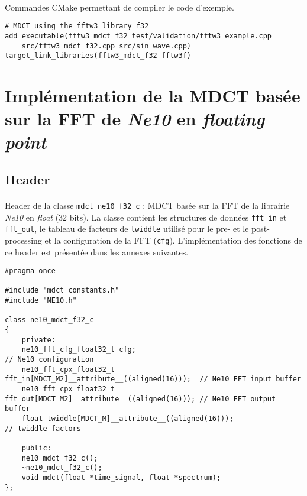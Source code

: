 \documentclass{article}
\begin{document}
\paragraph{}
Commandes CMake permettant de compiler le code d'exemple.
\lstset{language=make}
\begin{lstlisting}
# MDCT using the fftw3 library f32
add_executable(fftw3_mdct_f32 test/validation/fftw3_example.cpp
    src/fftw3_mdct_f32.cpp src/sin_wave.cpp)
target_link_libraries(fftw3_mdct_f32 fftw3f)
\end{lstlisting}




\newpage
\section{Implémentation de la MDCT basée sur la FFT de \emph{Ne10} en \emph{floating point}}\label{app:mdct_ne10_f32}
\subsection{Header}\label{app:mdct_ne10_f32_header}
\paragraph{}
Header de la classe \texttt{mdct\_ne10\_f32\_c} : MDCT basée sur la FFT de la librairie \emph{Ne10} en \emph{float} (32 bits). La classe contient les structures de données \texttt{fft\_in} et \texttt{fft\_out}, le tableau de facteurs de \texttt{twiddle} utilisé pour le pre- et le post-processing et la configuration de la FFT (\texttt{cfg}). L'implémentation des fonctions de ce header est présentée dans les annexes suivantes.
\lstset{language=C++}
\begin{lstlisting}
#pragma once

#include "mdct_constants.h"
#include "NE10.h"

class ne10_mdct_f32_c
{
    private:
    ne10_fft_cfg_float32_t cfg;                                          // Ne10 configuration
    ne10_fft_cpx_float32_t fft_in[MDCT_M2]__attribute__((aligned(16)));  // Ne10 FFT input buffer
    ne10_fft_cpx_float32_t fft_out[MDCT_M2]__attribute__((aligned(16))); // Ne10 FFT output buffer
    float twiddle[MDCT_M]__attribute__((aligned(16)));                   // twiddle factors

    public:
    ne10_mdct_f32_c();
    ~ne10_mdct_f32_c();
    void mdct(float *time_signal, float *spectrum);
};
\end{lstlisting}
\end{document}

